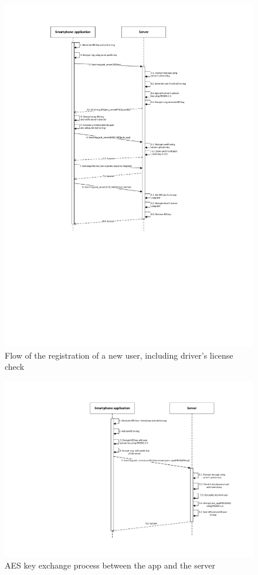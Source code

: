 \documentclass[12pt,a4paper, oneside]{article}
\begin{document}
\begin{figure}[H]
\centering
\includegraphics[width=\textwidth, height=.9\textheight,keepaspectratio]{assets/sequencediagram-registration}
\caption{Flow of the registration of a new user, including driver's license check}
\label{fig:sequencediagram-registration}
\end{figure}

\begin{figure}[H]
\centering
\includegraphics[width=\textwidth]{assets/sequencediagram-keyexchange}
\caption{AES key exchange process between the app and the server}
\label{fig:sequencediagram-keyexchange}
\end{figure}
\end{document}
